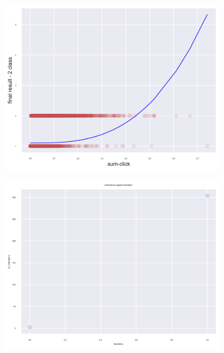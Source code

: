 \documentclass[11pt, a4paper, twocolumn]{article}
\begin{document}
\begin{figure}[h]
	\includegraphics[width=0.99\linewidth]{SVR-Polynomial-Kernel_2_class_model_against_sum-click.png} 
	\label{fig:PolyClicks}
	\caption{}
\end{figure}
\centering
\begin{figure}[h]
	\includegraphics[width=0.99\linewidth]{Estimators_against_iteration.png} 
	\label{fig:estimators}
	\caption{}
\end{figure}
\centering
\end{document}
